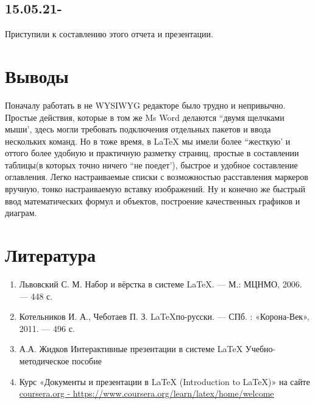 \documentclass[14pt, a4paper]{extarticle}
\begin{document}
\subsection{15.05.21-}
Приступили к составлению этого отчета и презентации.



\section{Выводы}
Поначалу работать в не WYSIWYG редакторе было трудно и непривычно. Простые действия, которые в том же Ms Word делаются ``двумя щелчками мыши', здесь могли требовать подключения отдельных пакетов и ввода нескольких команд. Но в тоже время, в LaTeX мы имели более ``жесткую' и оттого более удобную и практичную разметку страниц, простые в составлении таблицы(в которых точно ничего ``не поедет'), быстрое и удобное составление оглавления. Легко настраиваемые списки с возможностью расставления маркеров вручную, тонко настраиваемую вставку изображений. Ну и конечно же быстрый ввод математических формул и объектов, построение качественных графиков и диаграм.   

\section{Литература}
\begin{enumerate} 
\item Львовский С. М. Набор и вёрстка в системе \LaTeX. — М.: МЦНМО, 2006. — 448 с.
\item Котельников И. А., Чеботаев П. З. \LaTeX по-русски. — СПб. : «Корона-Век», 2011. — 496 с.
\item А.А. Жидков Интерактивные презентации в системе \LaTeX
Учебно-методическое пособие
\item Курс «Документы и презентации в LaTeX (Introduction to \LaTeX)» на сайте \url{coursera.org - https://www.coursera.org/learn/latex/home/welcome}
\end{enumerate}
\end{document}
